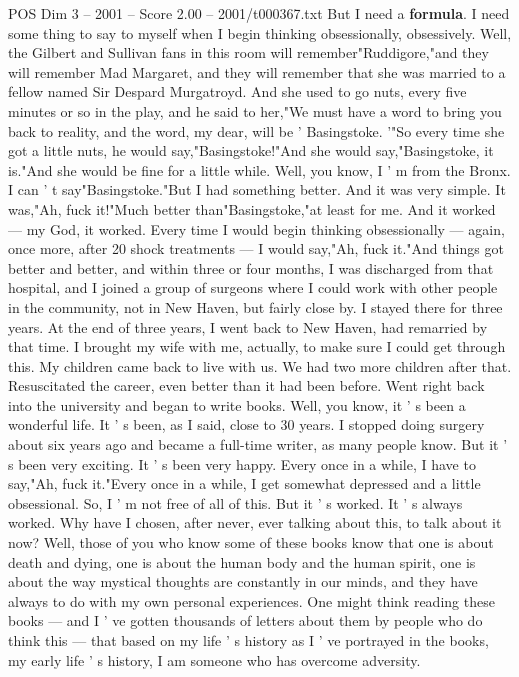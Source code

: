 \begin{textsample}{POS Dim 3 – 2001 – Score 2.00 – 2001/t000367.txt}
But I need a \textbf{formula}.
I need some thing to say to myself when I begin thinking obsessionally, obsessively.
Well, the Gilbert and Sullivan fans in this room will remember"Ruddigore,"and they will remember Mad Margaret, and they will remember that she was married to a fellow named Sir Despard Murgatroyd.
And she used to go nuts, every five minutes or so in the play, and he said to her,"We must have a word to bring you back to reality, and the word, my dear, will be ' Basingstoke. '"So every time she got a little nuts, he would say,"Basingstoke!"And she would say,"Basingstoke, it is."And she would be fine for a little while.
Well, you know, I ' m from the Bronx.
I can ' t say"Basingstoke."But I had something better.
And it was very simple.
It was,"Ah, fuck it!"Much better than"Basingstoke,"at least for me.
And it worked — my God, it worked.
Every time I would begin thinking obsessionally — again, once more, after 20 shock treatments — I would say,"Ah, fuck it."And things got better and better, and within three or four months, I was discharged from that hospital, and I joined a group of surgeons where I could work with other people in the community, not in New Haven, but fairly close by.
I stayed there for three years.
At the end of three years, I went back to New Haven, had remarried by that time.
I brought my wife with me, actually, to make sure I could get through this.
My children came back to live with us.
We had two more children after that.
Resuscitated the career, even better than it had been before.
Went right back into the university and began to write books.
Well, you know, it ' s been a wonderful life.
It ' s been, as I said, close to 30 years.
I stopped doing surgery about six years ago and became a full-time writer, as many people know.
But it ' s been very exciting.
It ' s been very happy.
Every once in a while, I have to say,"Ah, fuck it."Every once in a while, I get somewhat depressed and a little obsessional.
So, I ' m not free of all of this.
But it ' s worked.
It ' s always worked.
Why have I chosen, after never, ever talking about this, to talk about it now?
Well, those of you who know some of these books know that one is about death and dying, one is about the human body and the human spirit, one is about the way mystical thoughts are constantly in our minds, and they have always to do with my own personal experiences.
One might think reading these books — and I ' ve gotten thousands of letters about them by people who do think this — that based on my life ' s history as I ' ve portrayed in the books, my early life ' s history, I am someone who has overcome adversity.

\end{textsample}
